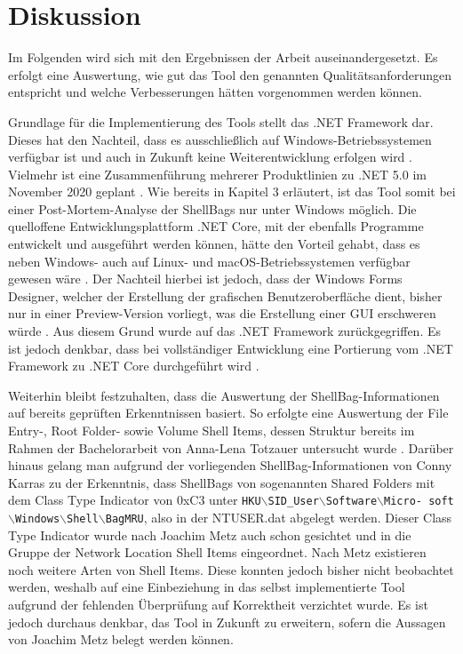 \section{Diskussion}
Im Folgenden wird sich mit den Ergebnissen der Arbeit auseinandergesetzt. Es erfolgt eine Auswertung, wie gut das Tool den genannten Qualitätsanforderungen entspricht und welche Verbesserungen hätten vorgenommen werden können.

Grundlage für die Implementierung des Tools stellt das .NET Framework dar. Dieses hat den Nachteil, dass es ausschließlich auf Windows-Betriebssystemen verfügbar ist \cite{netfw} und auch in Zukunft keine Weiterentwicklung erfolgen wird \cite{ende}. Vielmehr ist eine Zusammenführung mehrerer Produktlinien zu .NET 5.0 im November 2020 geplant \cite{ende}. Wie bereits in Kapitel 3 erläutert, ist das Tool somit bei einer Post-Mortem-Analyse der ShellBags nur unter Windows möglich. Die quelloffene Entwicklungsplattform .NET Core, mit der ebenfalls Programme entwickelt und ausgeführt werden können, hätte den Vorteil gehabt, dass es neben Windows- auch auf Linux- und macOS-Betriebssystemen verfügbar gewesen wäre \cite{netcore}. Der Nachteil hierbei ist jedoch, dass der Windows Forms Designer, welcher der Erstellung der grafischen Benutzeroberfläche dient, bisher nur in einer Preview-Version vorliegt, was die Erstellung einer GUI erschweren würde \cite{preview}. Aus diesem Grund wurde auf das .NET Framework zurückgegriffen. Es ist jedoch denkbar, dass bei vollständiger Entwicklung eine Portierung vom .NET Framework zu .NET Core durchgeführt wird \cite{port}.

Weiterhin bleibt festzuhalten, dass die Auswertung der ShellBag-Informationen auf bereits geprüften Erkenntnissen basiert. So erfolgte eine Auswertung der File Entry-, Root Folder- sowie Volume Shell Items, dessen Struktur bereits im Rahmen der Bachelorarbeit von Anna-Lena Totzauer untersucht wurde \cite{ba}. Darüber hinaus gelang man aufgrund der vorliegenden ShellBag-Informationen von Conny Karras zu der Erkenntnis, dass ShellBags von sogenannten Shared Folders mit dem Class Type Indicator von 0xC3 unter \texttt{HKU$\backslash$SID\_User$\backslash$Software$\backslash$Micro- \newline soft$\backslash$Windows$\backslash$Shell$\backslash$BagMRU}, also in der NTUSER.dat abgelegt werden. Dieser Class Type Indicator wurde nach Joachim Metz auch schon gesichtet und in die Gruppe der Network Location Shell Items eingeordnet. Nach Metz existieren noch weitere Arten von Shell Items. Diese konnten jedoch bisher nicht beobachtet werden, weshalb auf eine Einbeziehung in das selbst implementierte Tool aufgrund der fehlenden Überprüfung auf Korrektheit verzichtet wurde. Es ist jedoch durchaus denkbar, das Tool in Zukunft zu erweitern, sofern die Aussagen von Joachim Metz belegt werden können. \cite{shelltype}

